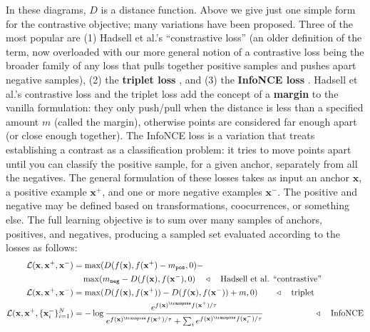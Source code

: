 In these diagrams, $D$ is a distance function. Above we give just one simple form for the contrastive objective; many variations have been proposed. Three of the most popular are (1) Hadsell et al.'s ``constrastive loss'' \cite{hadsell2006dimensionality} (an older definition of the term, now overloaded with our more general notion of a contrastive loss being the broader family of any loss that pulls together positive samples and pushes apart negative samples), (2) the \textbf{triplet loss} \cite{chechik2010large}, and (3) the \textbf{InfoNCE loss} \cite{oord2018representation}. Hadsell et al.'s contrastive loss and the triplet loss add the concept of a \textbf{margin} to the vanilla formulation: they only push/pull when the distance is less than a specified amount $m$ (called the margin), otherwise points are considered far enough apart (or close enough together). The InfoNCE loss is a variation that treats establishing a contrast as a classification problem: it tries to move points apart until you can classify the positive sample, for a given anchor, separately from all the negatives. The general formulation of these losses takes as input an anchor $\mathbf{x}$, a positive example $\mathbf{x}^+$, and one or more negative examples $\mathbf{x}^-$. The positive and negative may be defined based on transformations, coocurrences, or something else. The full learning objective is to sum over many samples of anchors, positives, and negatives, producing a sampled set evaluated according to the losses as follows:
\begin{align}
    \mathcal{L}(\mathbf{x}, \mathbf{x}^+, \mathbf{x}^-) &= \max(D(f(\mathbf{x}), f(\mathbf{x}^+)-m_{\texttt{pos}},0) - \nonumber \\ &\quad \max(m_{\texttt{neg}} - D(f(\mathbf{x}), f(\mathbf{x}^-),0) \quad \triangleleft \quad \text{Hadsell et al. ``contrastive''}\\
    \mathcal{L}(\mathbf{x}, \mathbf{x}^+, \mathbf{x}^-) &= \max(D(f(\mathbf{x}), f(\mathbf{x}^+)) - D(f(\mathbf{x}), f(\mathbf{x}^-)) + m, 0) \quad\quad \triangleleft \quad \text{triplet}\\
    \mathcal{L}(\mathbf{x}, \mathbf{x}^+, \{\mathbf{x}_i^-\}_{i=1}^N) &= -\log \frac{e^{f(\mathbf{x})^\transpose f(\mathbf{x}^+)/\tau}}{e^{f(\mathbf{x})^\transpose f(\mathbf{x}^+)/\tau} + \sum_i e^{f(\mathbf{x})^\transpose f(\mathbf{x}_i^-)/\tau}} \quad\quad\quad\quad\quad\quad\triangleleft \quad \text{InfoNCE} \label{eqn:representation_learning:infonce}
\end{align}
